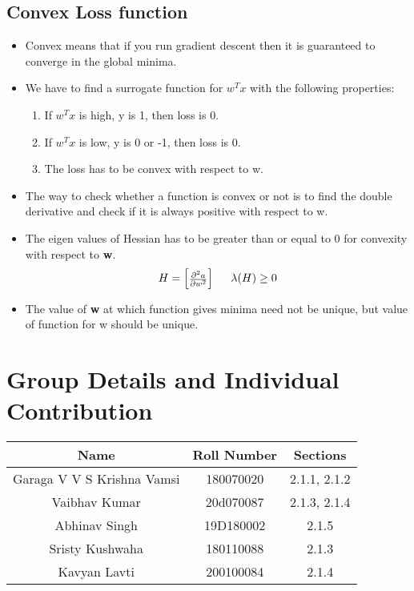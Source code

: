 \documentclass[11pt, twosides]{article}
\begin{document}
\subsection{Convex Loss function }
\begin{itemize}
    \item Convex means that if you run gradient descent then it is guaranteed to converge in the global minima.
    \item We have to find a surrogate function for $w^{T}x$ with the following properties:
    \begin{enumerate}
    \item If $w^{T}x$ is high, y is 1, then loss is 0.
    \item If $w^{T}x$ is low, y is 0 or -1, then loss is 0.
    \item The loss has to be convex with respect to w.
    \end{enumerate}
\item The way to check whether a function is convex or not is to find the double derivative and check if it is always positive with respect to w.
\item The eigen values of Hessian has to be greater than or equal to 0 for convexity with respect to \textbf{w}.
\begin{equation*}
H =
\begin{bmatrix}
\frac{\partial^2 a}{\partial w^2} 
\end{bmatrix}
\hspace{5mm} 
\lambda(H) \geq 0
\end{equation*}
\item The value of \textbf{w} at which function gives minima need not be unique, but value of function for w should be unique.
\end{itemize}
\section{Group Details and Individual Contribution}
\begin{center}
    \begin{tabular}{|c|c|c|}
    \hline
    \textbf{Name}& \textbf{Roll Number} & \textbf{Sections}\\
    \hline
    Garaga V V S Krishna Vamsi & 180070020 & 2.1.1, 2.1.2\\
    \hline
    Vaibhav Kumar & 20d070087 & 2.1.3, 2.1.4\\
    \hline
    Abhinav Singh & 19D180002 & 2.1.5\\
    \hline
    Sristy Kushwaha & 180110088 & 2.1.3\\
    \hline
    Kavyan Lavti & 200100084 & 2.1.4 \\
    \hline
    
    \end{tabular}
\end{center}
\end{document}
